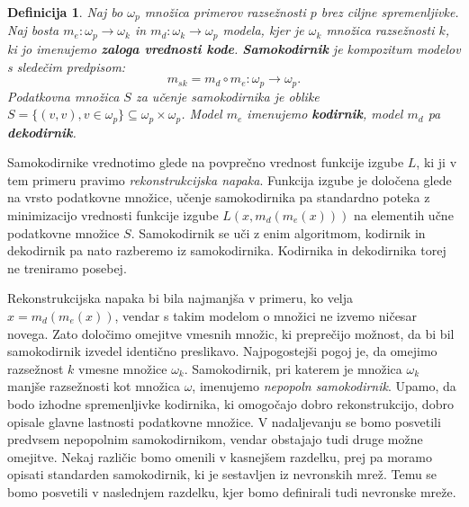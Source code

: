 \documentclass[12pt,a4paper]{article}
\newtheorem{definicija}{Definicija}
\begin{document}
\begin{definicija}
Naj bo $\omega_p$ množica primerov razsežnosti $p$ brez ciljne spremenljivke. Naj bosta $m_e: \omega_p \rightarrow \omega_k$ in $m_d: \omega_k \rightarrow \omega_p$ modela, kjer je $\omega_k$ množica razsežnosti $k$, ki jo imenujemo \textbf{zaloga vrednosti kode}. \textbf{Samokodirnik} je kompozitum modelov s sledečim predpisom:
\[
m_{s k} = m_d \circ m_e : \omega_p \rightarrow \omega_p .
\]
Podatkovna množica $S$ za učenje samokodirnika je oblike $S = \{(v, v), v \in \omega_p\} \subseteq \omega_p \times \omega_p$. Model $m_e$ imenujemo \textbf{kodirnik}, model $m_d$ pa \textbf{dekodirnik}.
\end{definicija}

Samokodirnike vrednotimo glede na povprečno vrednost funkcije izgube $L$, ki ji v tem primeru pravimo \emph{rekonstrukcijska napaka}. 
Funkcija izgube je določena glede na vrsto podatkovne množice, učenje samokodirnika pa standardno poteka z minimizacijo vrednosti funkcije izgube $L(x,m_d(m_e(x)))$ na elementih učne podatkovne množice $S$. 
Samokodirnik se uči z enim algoritmom, kodirnik in dekodirnik pa nato razberemo iz samokodirnika. Kodirnika in dekodirnika torej ne treniramo posebej.

Rekonstrukcijska napaka bi bila najmanjša v primeru, ko velja $x =m_d(m_e(x))$, vendar s takim modelom o množici ne izvemo ničesar novega. 
Zato določimo omejitve vmesnih množic, ki preprečijo možnost, da bi bil samokodirnik izvedel identično preslikavo. 
Najpogostejši pogoj je, da omejimo razsežnost $k$ vmesne množice $\omega_k$. 
Samokodirnik, pri katerem je množica $\omega_k$ manjše razsežnosti kot množica $\omega$, imenujemo \emph{nepopoln samokodirnik}. 
Upamo, da bodo izhodne spremenljivke kodirnika, ki omogočajo dobro rekonstrukcijo, dobro opisale glavne lastnosti podatkovne množice. 
V nadaljevanju se bomo posvetili predvsem nepopolnim samokodirnikom, vendar obstajajo tudi druge možne omejitve. 
Nekaj različic bomo omenili v kasnejšem razdelku, prej pa moramo opisati standarden samokodirnik, ki je sestavljen iz nevronskih mrež. 
Temu se bomo posvetili v naslednjem razdelku, kjer bomo definirali tudi nevronske mreže.
\end{document}

